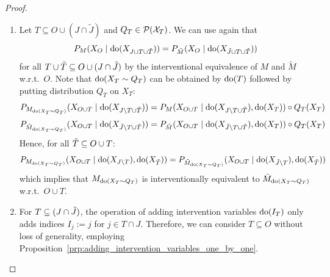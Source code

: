 \begin{proof}
\begin{enumerate}[resume*]
\item
  Let $T \subseteq O \cup (J \cap \tilde{J})$ and $Q_T \in \mathcal{P}(\mathcal{X}_T)$.
  We can use again that
  $$P_M(X_{O} \mid \operatorname{do}(X_{J \cup T \cup \tilde{T}})) = P_{\tilde{M}}(X_{O} \mid \operatorname{do}(X_{\tilde{J} \cup T \cup \tilde{T}}))$$
  for all $T \cup \tilde{T} \subseteq O \cup (J \cap \tilde{J})$ by the interventional equivalence of $M$ and $\tilde{M}$ w.r.t.\ $O$.
  Note that $\operatorname{do}(X_T\sim Q_T)$ can be obtained by $\operatorname{do}(T)$ followed by putting distribution $Q_T$ on $X_T$:
      $$P_{M_{\operatorname{do}(X_T\sim Q_T)}}(X_{O \cup T} \mid \operatorname{do}(X_{J\setminus T \cup \tilde{T}})) = P_M(X_{O \cup T} \mid \operatorname{do}(X_{J \setminus T \cup \tilde{T}}),\operatorname{do}(X_T)) \circ Q_T(X_T)$$
      $$P_{\tilde{M}_{\operatorname{do}(X_T\sim Q_T)}}(X_{O \cup T} \mid \operatorname{do}(X_{\tilde{J}\setminus T\cup \tilde{T}})) = P_{\tilde{M}}(X_{O \cup T} \mid \operatorname{do}(X_{\tilde{J} \setminus T \cup \tilde{T}}),\operatorname{do}(X_T)) \circ Q_T(X_T)$$
  Hence, for all $\tilde{T} \subseteq O \cup T$:
      $$P_{M_{\operatorname{do}(X_T\sim Q_T)}}(X_{O \cup T} \mid \operatorname{do}(X_{J\setminus T}),\operatorname{do}(X_{\tilde{T}})) = P_{\tilde{M}_{\operatorname{do}(X_T\sim Q_T)}}(X_{O \cup T} \mid \operatorname{do}(X_{\tilde{J}\setminus T}),\operatorname{do}(X_{\tilde{T}}))$$
  which implies that $M_{\operatorname{do}(X_T\sim Q_T)}$ is interventionally equivalent to $\tilde{M}_{\operatorname{do}(X_T\sim Q_T)}$ w.r.t.\ $O \cup T$.
  \item For $T \subseteq (J \cap \tilde{J})$, the operation of adding intervention variables $\operatorname{do}(I_{T})$ only adds indices $I_j := j$ for $j \in T \cap J$.
    Therefore, we can consider $T \subseteq O$ without loss of generality, employing Proposition~\ref{prp:adding_intervention_variables_one_by_one}.


\end{enumerate}
\end{proof}
